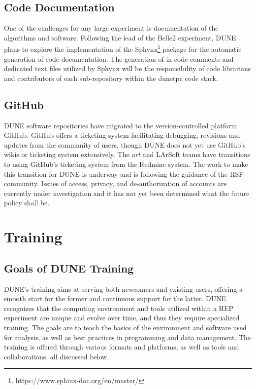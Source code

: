 \documentclass[../main-v1.tex]{subfiles}
\begin{document}
\subsection{Code Documentation}
One of the challenges for any large experiment is documentation of the algorithms and software. Following the lead of the Belle2 experiment, DUNE plans to explore the implementation of the Sphynx\footnote{https://www.sphinx-doc.org/en/master/} package for the automatic generation of code documentation. The generation of in-code comments and dedicated text files utilized by Sphynx will be the responsibility of code librarians and contributors of each sub-repository within the dunetpc code stack.


\subsection{GitHub}
DUNE software repositories have migrated to the version-controlled platform GitHub.  GitHub offers a ticketing system facilitating debugging, revisions and updates from the community of users, though DUNE does not yet use GitHub's wikis or ticketing system extensively.  The {\it art} and LArSoft teams have transitions to using GitHub's ticketing system from the Redmine system.  The work to make this transition for DUNE is underway and is following the guidance of the HSF community. Issues of access, privacy, and de-authorization of accounts are currently under investigation and it has not yet been determined what the future policy shall be.


\section{Training }


\subsection{Goals of DUNE Training}
DUNE’s training aims at serving both newcomers and existing users, offering a smooth start for the former and continuous support for the latter. DUNE recognizes that the computing environment and tools utilized within a HEP experiment are unique and evolve over time, and thus they require specialized training. The goals are to teach the basics of the environment and software used for analysis, as well as best practices in programming and data management. The training is offered through various formats and platforms, as well as tools and collaborations, all discussed below. 
\end{document}
